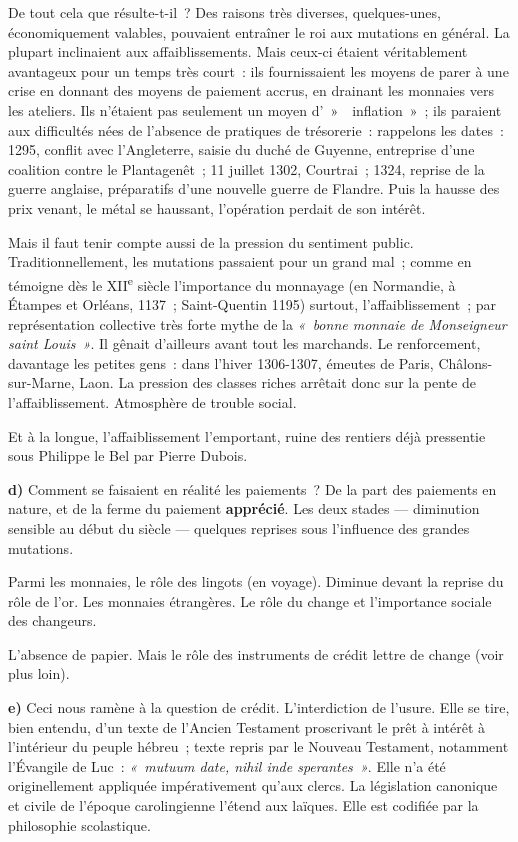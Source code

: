 \documentclass[french,twoside]{book} %
\newcommand{\labelchar}[1]{\textbf{\color{rubric} #1}}
\newcommand\term[1]{\textbf{#1}}
\begin{document}
\noindent De tout cela que résulte-t-il ? Des raisons très diverses, quelques-unes, économiquement valables, pouvaient entraîner le roi aux mutations en général. La plupart inclinaient aux affaiblissements. Mais ceux-ci étaient véritablement avantageux pour un temps très court : ils fournissaient les moyens de parer à une crise en donnant des moyens de paiement accrus, en drainant les monnaies vers les ateliers. Ils n’étaient pas seulement un moyen d’ »  inflation » ; ils paraient aux difficultés nées de l’absence de pratiques de trésorerie :  
\label{p94} rappelons les dates : 1295, conflit avec l’Angleterre, saisie du duché de Guyenne, entreprise d’une coalition contre le Plantagenêt ; 11 juillet 1302, Courtrai ; 1324, reprise de la guerre anglaise, préparatifs d’une nouvelle guerre de Flandre. Puis la hausse des prix venant, le métal se haussant, l’opération perdait de son intérêt.\par
Mais il faut tenir compte aussi de la pression du sentiment public. Traditionnellement, les mutations passaient pour un grand mal ; comme en témoigne dès le XII\textsuperscript{e} siècle l’importance du monnayage (en Normandie, à Étampes et Orléans, 1137 ; Saint-Quentin 1195) surtout, l’affaiblissement ; par représentation collective très forte mythe de la \emph{« bonne monnaie de Monseigneur saint Louis »}. Il gênait d’ailleurs avant tout les marchands. Le renforcement, davantage les petites gens : dans l’hiver 1306-1307, émeutes de Paris, Châlons-sur-Marne, Laon. La pression des classes riches arrêtait donc sur la pente de l’affaiblissement. Atmosphère de trouble social.\par
Et à la longue, l’affaiblissement l’emportant, ruine des rentiers déjà pressentie sous Philippe le Bel par Pierre Dubois.\par
\bigbreak
\noindent \labelchar{d)} Comment se faisaient en réalité les paiements ? De la part des paiements en nature, et de la ferme du paiement \term{apprécié}. Les deux stades — diminution sensible au début du siècle — quelques reprises sous l’influence des grandes mutations.\par
Parmi les monnaies, le rôle des lingots (en voyage). Diminue devant la reprise du rôle de l’or. Les monnaies étrangères. Le rôle du change et l’importance sociale des changeurs.\par
L’absence de papier. Mais le rôle des instruments de crédit lettre de change (voir plus loin).\par
\bigbreak
\noindent \labelchar{e)} Ceci nous ramène à la question de crédit. L’interdiction de l’usure. Elle se tire, bien entendu, d’un texte de l’Ancien Testament proscrivant le prêt à intérêt à l’intérieur du peuple hébreu ; texte repris par le Nouveau Testament, notamment l’Évangile de Luc : \emph{« mutuum date, nihil inde sperantes »}. Elle n’a été originellement appliquée impérativement qu’aux clercs. La législation canonique et civile de l’époque carolingienne l’étend aux laïques. Elle est codifiée par la philosophie scolastique.\par
\end{document}

